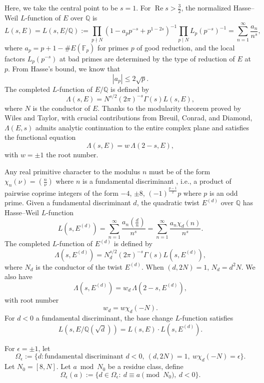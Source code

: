 \documentclass[12pt,reqno]{amsart}
\numberwithin{equation}{section}
\theoremstyle{plain}
\theoremstyle{definition}
\theoremstyle{remark}
\renewcommand{\Re}{\operatorname{Re}}
\begin{document}
Here, we take the central point to be $s=1$.
For $\Re s>\frac{3}{2}$, the normalized Hasse--Weil $L$-function of $E$ over $\mathbb{Q}$ is
\[
L(s,E) =
L(s,E/\mathbb{Q})
:=\prod_{p \nmid N} \left(1 - a_p p^{-s} + p^{1 - 2s} \right)^{-1} \prod_{p \mid N} L_p(p^{-s})^{-1}
=\sum_{n=1}^\infty \frac{a_n}{n^s},
\]
where \( a_p = p + 1 - \#E(\mathbb{F}_p) \) for primes \( p \) of good reduction, and the local factors \( L_p(p^{-s}) \) at bad primes are determined by the type of reduction of \( E \) at \( p \).
From Hasse's bound, we know that
\[
|a_p| \leq 2 \sqrt{p}.
\]
The completed \(L\)-function of \( E/\mathbb{Q} \) is defined by
\[
\Lambda(s,E)
=
N^{s/2} (2\pi)^{-s} \Gamma(s) L(s,E),
\]
where \( N \) is the conductor of \( E \). Thanks to the modularity theorem proved by Wiles and Taylor, with crucial contributions from Breuil, Conrad, and Diamond, \( \Lambda(E, s) \) admits analytic continuation to the entire complex plane and satisfies the functional equation
\[
\Lambda(s,E) = w \, \Lambda(2-s,E),
\]
with \( w = \pm 1 \) the root number.

Any real primitive character to the modulus $n$ must be of the form $\chi_n(\nu)=(\frac{n}{\nu})$ where $n$ is a fundamental discriminant \cite[Theorem 9.13]{MontgomeryVaughan2007}, i.e., a product of pairwise coprime integers of the form $-4$, $\pm 8$, $(-1)^{\frac{p-1}{2}}p$ where $p$ is an odd prime.
Given a fundamental discriminant \( d \), the quadratic twist \( E^{(d)} \) over $\mathbb{Q}$ has Hasse--Weil \( L \)-function
\[
L(s,E^{(d)})
=
\sum_{n=1}^\infty \frac{a_n \left(\frac{d}{n}\right)}{n^s}
=\sum_{n=1}^\infty \frac{a_n \chi_d(n)}{n^s}.
\]
The completed \(L\)-function of \(E^{(d)}\) is defined by
\[
\Lambda(s,E^{(d)}) = N_d^{s/2} (2\pi)^{-s} \Gamma(s) L(s,E^{(d)}),
\]
where \(N_d\) is the conductor of the twist \(E^{(d)}\).
When $(d,2N)=1$, \(N_d=d^2N\).
We also have
\[
\Lambda(s,E^{(d)}) = w_d \, \Lambda(2-s,E^{(d)}),
\]
with root number
\begin{equation}\label{epsilon}
  w_d=w\chi_d(-N).
\end{equation}
For \( d < 0 \) a fundamental discriminant, the base change \(L\)-function satisfies
\[
L(s, E/\mathbb{Q}(\sqrt{d})) = L(s, E) \cdot L(s, E^{(d)}).
\]

For $\epsilon=\pm 1$, let
\begin{equation*}
  \Omega_{\epsilon} := \{d:\textrm{fundamental discriminant }d<0,~ (d,2N)=1,~ w\chi_d(-N)=\epsilon\}.
\end{equation*}
Let $N_0=[8,N]$.
Let \( a \bmod N_0 \) be a residue class, define
\begin{equation*}
\Omega_{\epsilon}(a) := \{d\in \Omega_{\epsilon} : \  d\equiv a\pmod {N_0}, \ d<0\} .
\end{equation*}
\end{document}
